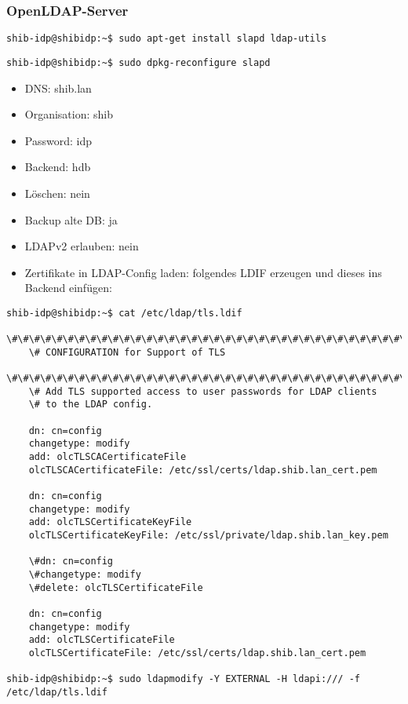 \subsubsection{OpenLDAP-Server}
\begin{lstlisting}
shib-idp@shibidp:~$ sudo apt-get install slapd ldap-utils
\end{lstlisting}
\begin{lstlisting}
shib-idp@shibidp:~$ sudo dpkg-reconfigure slapd
\end{lstlisting}
\begin{itemize}
	\item DNS: shib.lan
	\item Organisation: shib
	\item Password: idp
	\item Backend: hdb
	\item Löschen: nein
	\item Backup alte DB: ja
	\item LDAPv2 erlauben: nein
\end{itemize}

\begin{itemize}
  	\item Zertifikate in LDAP-Config laden: folgendes LDIF erzeugen und dieses
  ins Backend einfügen:
\end{itemize}
\begin{lstlisting}
shib-idp@shibidp:~$ cat /etc/ldap/tls.ldif
	\#\#\#\#\#\#\#\#\#\#\#\#\#\#\#\#\#\#\#\#\#\#\#\#\#\#\#\#\#\#\#\#\#\#\#\#\#\#\#\#\#\#\#\#\#\#\#\#\#\#\#\#\#\#\#\#\#\#\#
	\# CONFIGURATION for Support of TLS
	\#\#\#\#\#\#\#\#\#\#\#\#\#\#\#\#\#\#\#\#\#\#\#\#\#\#\#\#\#\#\#\#\#\#\#\#\#\#\#\#\#\#\#\#\#\#\#\#\#\#\#\#\#\#\#\#\#\#\#
	\# Add TLS supported access to user passwords for LDAP clients
	\# to the LDAP config.

	dn: cn=config
	changetype: modify
	add: olcTLSCACertificateFile
	olcTLSCACertificateFile: /etc/ssl/certs/ldap.shib.lan_cert.pem

	dn: cn=config
	changetype: modify
	add: olcTLSCertificateKeyFile
	olcTLSCertificateKeyFile: /etc/ssl/private/ldap.shib.lan_key.pem

	\#dn: cn=config
	\#changetype: modify
	\#delete: olcTLSCertificateFile

	dn: cn=config
	changetype: modify
	add: olcTLSCertificateFile
	olcTLSCertificateFile: /etc/ssl/certs/ldap.shib.lan_cert.pem

shib-idp@shibidp:~$ sudo ldapmodify -Y EXTERNAL -H ldapi:/// -f /etc/ldap/tls.ldif
\end{lstlisting}

